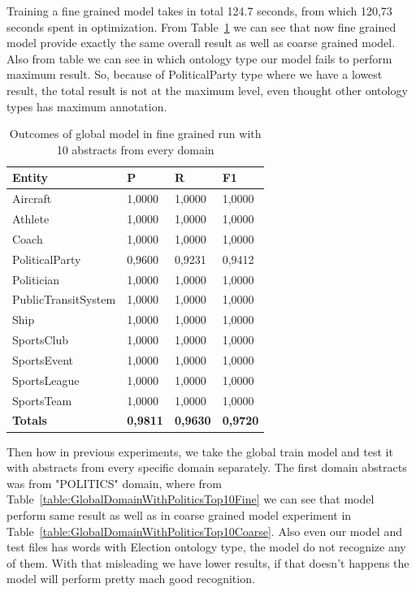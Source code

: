\documentclass[thesis=M,english]{FITthesis}[2018/05/30]
\begin{document}
	Training a fine grained model takes in total 124.7 seconds, from which 120,73 seconds spent in optimization. From Table~\ref{table:GlobalDomainWithAllAbstractsTop10Fine} we can see that now fine grained model provide exactly the same overall result as well as coarse grained model. Also from table we can see in which ontology type our model fails to perform maximum result. So, because of PoliticalParty type where we have a lowest result, the total result is not at the maximum level, even thought other ontology types has maximum annotation.
	  	
	\begin{table}[H]\centering
		\begin{tabular}{|l|l|l|l|}
			\hline {\textbf{Entity}} & {\textbf{P}} & {\textbf{R}} & {\textbf{F1}}\\\hline
				Aircraft & 1,0000 & 1,0000 & 1,0000\\
				Athlete & 1,0000 & 1,0000 & 1,0000\\
				Coach & 1,0000 & 1,0000 & 1,0000\\
				PoliticalParty & 0,9600 & 0,9231 & 0,9412\\
				Politician & 1,0000 & 1,0000 & 1,0000\\
				PublicTransitSystem & 1,0000 & 1,0000 & 1,0000\\
				Ship & 1,0000 & 1,0000 & 1,0000\\
				SportsClub & 1,0000 & 1,0000 & 1,0000\\
				SportsEvent & 1,0000 & 1,0000 & 1,0000\\
				SportsLeague & 1,0000 & 1,0000 & 1,0000\\
				SportsTeam & 1,0000 & 1,0000 & 1,0000\\\hline
				\textbf{Totals} & \textbf{0,9811} & \textbf{0,9630} & \textbf{0,9720}\\\hline
		\end{tabular}
		\caption{Outcomes of global model in fine grained run with 10 abstracts from every domain \label{table:GlobalDomainWithAllAbstractsTop10Fine}}	
	\end{table}

	Then how in previous experiments, we take the global train model and test it with abstracts from every specific domain separately. 
	The first domain abstracts was from "POLITICS" domain, where from Table~\ref{table:GlobalDomainWithPoliticsTop10Fine} we can see that model perform same result as well as in coarse grained model experiment in Table~\ref{table:GlobalDomainWithPoliticsTop10Coarse}. Also even our model and test files has words with Election ontology type, the model do not recognize any of them. With that misleading we have lower results, if that doesn't happens the model will perform pretty mach good recognition.
	
\end{document}
